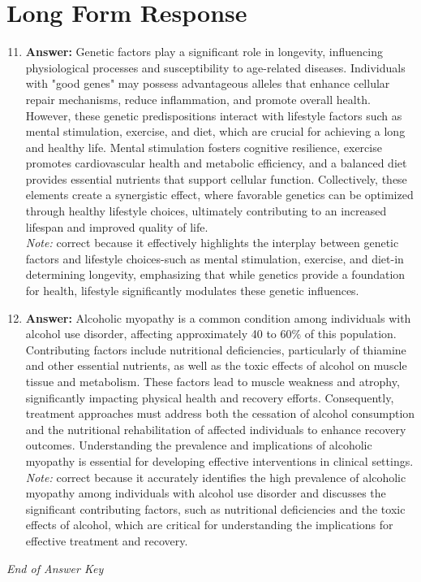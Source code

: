 \documentclass[12pt]{article}
\begin{document}
\section*{Long Form Response}
\begin{enumerate}[label=\arabic*.]
\setcounter{enumi}{10}
\item \textbf{Answer:} Genetic factors play a significant role in longevity, influencing physiological processes and susceptibility to age-related diseases. Individuals with "good genes" may possess advantageous alleles that enhance cellular repair mechanisms, reduce inflammation, and promote overall health. However, these genetic predispositions interact with lifestyle factors such as mental stimulation, exercise, and diet, which are crucial for achieving a long and healthy life. Mental stimulation fosters cognitive resilience, exercise promotes cardiovascular health and metabolic efficiency, and a balanced diet provides essential nutrients that support cellular function. Collectively, these elements create a synergistic effect, where favorable genetics can be optimized through healthy lifestyle choices, ultimately contributing to an increased lifespan and improved quality of life.
\\ \textit{Note:} correct because it effectively highlights the interplay between genetic factors and lifestyle choices-such as mental stimulation, exercise, and diet-in determining longevity, emphasizing that while genetics provide a foundation for health, lifestyle significantly modulates these genetic influences.
\item \textbf{Answer:} Alcoholic myopathy is a common condition among individuals with alcohol use disorder, affecting approximately 40 to 60\% of this population. Contributing factors include nutritional deficiencies, particularly of thiamine and other essential nutrients, as well as the toxic effects of alcohol on muscle tissue and metabolism. These factors lead to muscle weakness and atrophy, significantly impacting physical health and recovery efforts. Consequently, treatment approaches must address both the cessation of alcohol consumption and the nutritional rehabilitation of affected individuals to enhance recovery outcomes. Understanding the prevalence and implications of alcoholic myopathy is essential for developing effective interventions in clinical settings.
\\ \textit{Note:} correct because it accurately identifies the high prevalence of alcoholic myopathy among individuals with alcohol use disorder and discusses the significant contributing factors, such as nutritional deficiencies and the toxic effects of alcohol, which are critical for understanding the implications for effective treatment and recovery.
\end{enumerate}

\vfill
\noindent\textit{End of Answer Key}
\end{document}

